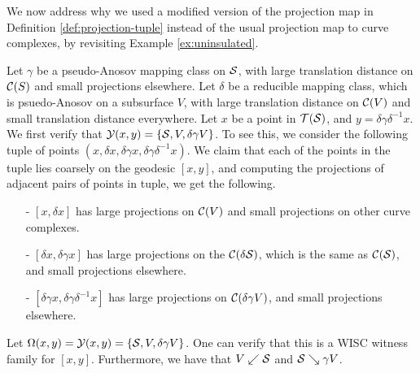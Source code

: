 \documentclass[12pt, reqno]{amsart}
\begin{document}
We now address why we used a modified version of the projection map in Definition \ref{def:projection-tuple} instead of the usual projection map to curve complexes, by revisiting Example \ref{ex:uninsulated}.
\begin{example}
  \label{ex:need-for-modified-projection}
  Let $\gamma$ be a pseudo-Anosov mapping class on $\mathcal{S}$, with large translation distance on $\mathcal{C}(S)$ and small projections elsewhere.
  Let $\delta$ be a reducible mapping class, which is psuedo-Anosov on a subsurface $V$, with large translation distance on $\mathcal{C}(V)$ and small translation distance everywhere.
  Let $x$ be a point in $\mathcal{T}(\mathcal{S})$, and $y = \delta \gamma \delta^{-1} x$.
  We first verify that $\mathcal{Y}(x,y) = \left\{ \mathcal{S}, V, \delta \gamma V \right\}$.
  To see this, we consider the following tuple of points $(x, \delta x, \delta \gamma x, \delta \gamma \delta^{-1}x)$.
  We claim that each of the points in the tuple lies coarsely on the geodesic $[x,y]$, and computing the projections of adjacent pairs of points in tuple, we get the following.
  \begin{itemize}
  \item[-] $[x, \delta x]$ has large projections on $\mathcal{C}(V)$ and small projections on other curve complexes.
  \item[-] $[\delta x, \delta \gamma x]$ has large projections on the $\mathcal{C}(\delta \mathcal{S})$, which is the same as $\mathcal{C}(\mathcal{S})$, and small projections elsewhere.
  \item[-] $[\delta \gamma x, \delta \gamma \delta^{-1} x]$ has large projections on $\mathcal{C}(\delta \gamma V)$, and small projections elsewhere.
  \end{itemize}
  Let $\Omega(x, y) = \mathcal{Y}(x,y) = \left\{ \mathcal{S}, V, \delta \gamma V \right\}$.
  One can verify that this is a WISC witness family for $[x,y]$.
  Furthermore, we have that $V \swarrow \mathcal{S}$ and $\mathcal{S} \searrow \gamma V$.


\end{example}
\end{document}
